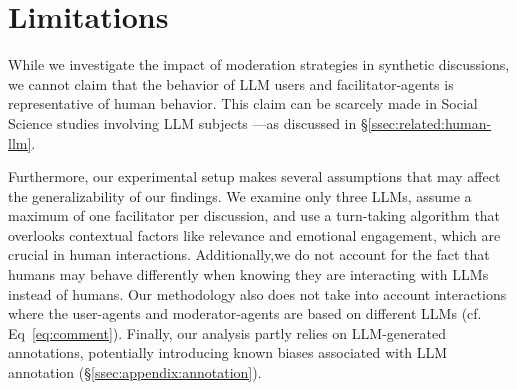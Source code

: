 %
\section{Limitations} 
\label{sec:limitations}


While we investigate the impact of moderation strategies in synthetic discussions, we cannot claim that the behavior of \ac{LLM} users and facilitator-agents is representative of human behavior. This claim can be scarcely made in Social Science studies involving \ac{LLM} subjects \cite{rossi_2024, zhou-etal-2024-real}—as discussed in \S\ref{ssec:related:human-llm}.

Furthermore, our experimental setup makes several assumptions that may affect the generalizability of our findings. We examine only three \acp{LLM}, assume a maximum of one facilitator per discussion, and use a turn-taking algorithm that overlooks contextual factors like relevance and emotional engagement, which are crucial in human interactions. Additionally,we do not account for the fact that humans may behave differently when knowing they are interacting with \acp{LLM} instead of humans. Our methodology also does not take into account interactions where the user-agents and moderator-agents are based on different LLMs (cf. Eq~\ref{eq:comment}). Finally, our analysis partly relies on \ac{LLM}-generated annotations, potentially introducing known biases associated with \ac{LLM} annotation (\S\ref{ssec:appendix:annotation}).